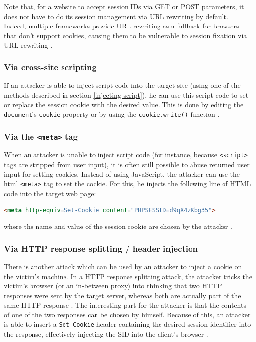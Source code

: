 Note that, for a website to accept session IDs via GET or POST parameters, it does not have to do its session management via URL rewriting by default. Indeed, multiple frameworks provide URL rewriting as a fallback for browsers that don't support cookies, causing them to be vulnerable to session fixation via URL rewriting \cite{PHPURLrewriting,Condit2006,Holovaty2008}.

\subsubsection{Via cross-site scripting}

If an attacker is able to inject script code into the target site (using one of the methods described in section \ref{injecting-script}), he can use this script code to set or replace the \gls{session cookie} with the desired value. This is done by editing the \texttt{document}'s \texttt{cookie} property \cite{Kolsek2002} or by using the \texttt{cookie.write()} function \cite{Johns2011}.

\subsubsection{Via the \texttt{<meta>} tag}

When an attacker is unable to inject script code (for instance, because \texttt{<script>} tags are stripped from user input), it is often still possible to abuse returned user input for setting cookies. Instead of using JavaScript, the attacker can use the \gls{html} \texttt{<meta>} tag to set the cookie. For this, he injects the following line of HTML code into the target web page:
\begin{lstlisting}[language=HTML]
<meta http-equiv=Set-Cookie content="PHPSESSID=d9qX4zKbg35">
\end{lstlisting}
where the name and value of the session cookie are chosen by the attacker \cite{Kolsek2002}.

\subsubsection{Via HTTP response splitting / header injection}

There is another attack which can be used by an attacker to inject a cookie on the victim's machine. In a HTTP response splitting attack, the attacker tricks the victim's browser (or an in-between proxy) into thinking that two HTTP responses were sent by the target server, whereas both are actually part of the same HTTP response \cite{Klein2004}. The interesting part for the attacker is that the contents of one of the two responses can be chosen by himself. Because of this, an attacker is able to insert a \texttt{Set-Cookie} header containing the desired session identifier into the response, effectively injecting the SID into the client's browser \cite{Johns2011}.

